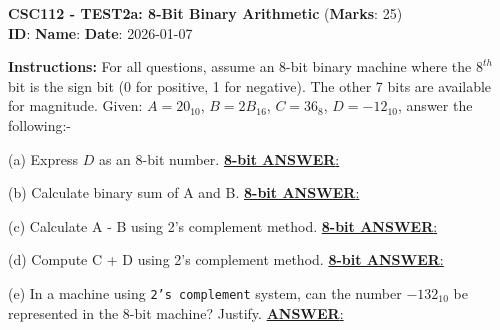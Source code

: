 \documentclass[12pt]{article}
\begin{document}
\begin{center}
\large\textbf{CSC112 - TEST2a: 8-Bit Binary Arithmetic} (\textbf{Marks}: 25) \\
 \textbf{ID}: \underline{\hspace{3cm}} \textbf{Name}: \underline{\hspace{8cm}} \quad  \textbf{Date}: 2026-01-07  
\end{center}

\textbf{Instructions:} For all questions, assume an 8-bit binary machine where the $8^{th}$ bit is the sign bit (0 for positive, 1 for negative). The other 7 bits are available for magnitude. Given: $A = 20_{10}$, $B = 2B_{16}$, $C = 36_{8}$, $D = -12_{10}$, answer the following:-

\begin{tcolorbox}
(a) Express $D$ as an 8-bit number.  \hfill  \uline{\textbf{8-bit ANSWER}: \hspace{0.2\textwidth}}

\vspace{3cm}

\end{tcolorbox}


\begin{tcolorbox}
(b) Calculate binary sum of A and B. \hfill  \uline{\textbf{8-bit ANSWER}: \hspace{0.2\textwidth}}

\vspace{5cm}

\end{tcolorbox}

\begin{tcolorbox}
(c) Calculate A - B using 2's complement method. \hfill  \uline{\textbf{8-bit ANSWER}: \hspace{0.2\textwidth}}

\vspace{5cm}

\end{tcolorbox}
\begin{tcolorbox}
(d) Compute C + D using 2's complement method. \hfill  \uline{\textbf{8-bit ANSWER}: \hspace{0.2\textwidth}}

\vspace{5cm}

\end{tcolorbox}
\begin{tcolorbox}
(e) In a machine using \texttt{2's complement} system, can the number $-132_{10}$ be represented in the 8-bit machine? Justify. \hfill \uline{\textbf{ANSWER}: \hspace{0.2\textwidth}}


\end{tcolorbox}
\end{document}
